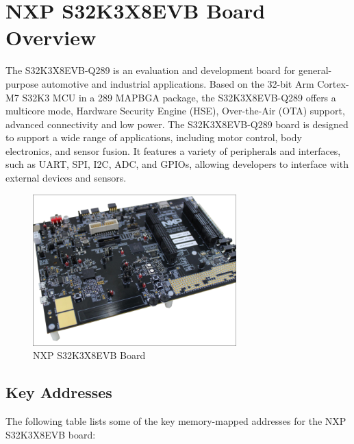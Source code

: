 \section{NXP S32K3X8EVB Board Overview}

The S32K3X8EVB-Q289 is an evaluation and development board for general-purpose automotive and industrial applications.
Based on the 32-bit Arm Cortex-M7 S32K3 MCU in a 289 MAPBGA package, the S32K3X8EVB-Q289 offers a multicore mode, Hardware Security Engine (HSE), Over-the-Air (OTA) support, advanced connectivity and low power.
The S32K3X8EVB-Q289 board is designed to support a wide range of applications, including motor control, body electronics, and sensor fusion. It features a variety of peripherals and interfaces, such as UART, SPI, I2C, ADC, and GPIOs, allowing developers to interface with external devices and sensors. 

\begin{figure}[H]
    \centering
    \includegraphics[width=0.7\textwidth]{chapters/figures/Board.png}
    \caption{NXP S32K3X8EVB Board}
    \label{fig:s32k3x8evbb}
\end{figure}

\subsection{Key Addresses}\label{subsec:key_addresses}

The following table lists some of the key memory-mapped addresses for the NXP S32K3X8EVB board:

